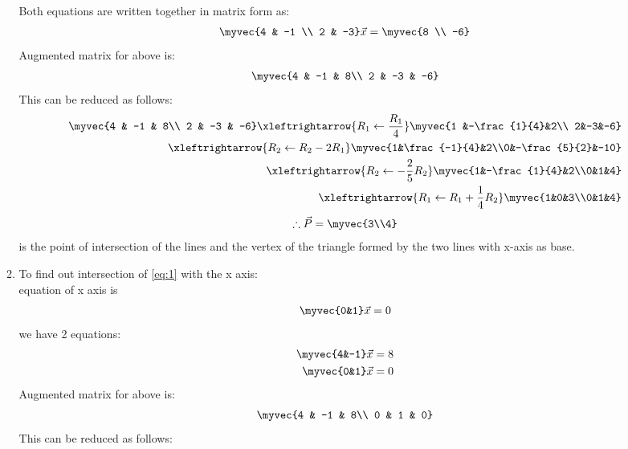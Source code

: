 \documentclass[journal,12pt,twocolumn]{IEEEtran}
\renewcommand\thesection{\arabic{section}}
\begin{document}
\begin{enumerate}[label=\thesection.\arabic*.,ref=\thesection.\theenumi]
\begin{enumerate}
Both equations are written together in matrix form as:
\begin{align}
    \myvec{4 & -1 \\ 2 & -3}\vec{x}=
\myvec{8 \\ -6}
\end{align}
Augmented matrix for above is:
\begin{align}
    \myvec{4 & -1 & 8\\
           2 & -3 & -6}
\end{align}
This can be reduced as follows:
 \begin{align}
     \myvec{4 & -1 & 8\\
           2 & -3 & -6}
          \xleftrightarrow{R_1 \leftarrow \frac{R_1}{4}}
    \myvec{1 &-\frac{1}{4}&2\\
        2&-3&-6}\\
        \xleftrightarrow{R_2\leftarrow R_2-2R_1}
    \myvec{1&\frac{-1}{4}&2\\0&-\frac{5}{2}&-10}\\
    \xleftrightarrow{R_2\leftarrow -\frac{2}{5}R_2}
    \myvec{1&-\frac{1}{4}&2\\0&1&4}\\
    \xleftrightarrow{R_1\leftarrow R_1+\frac{1}{4}R_2}
    \myvec{1&0&3\\0&1&4}
 \end{align}
\begin{align}
\therefore \vec{P}=\myvec{3\\4}
\end{align}
is the point of intersection of the lines and the vertex of the triangle formed by the two lines with x-axis as base.
\item To find out intersection of \eqref{eq:1} with the x axis:\\
    equation of x axis is 
    \begin{align}
        \myvec{0&1}\vec{x}=0
    \end{align}
    we have 2 equations: \begin{align}
        \myvec{4&-1}\vec{x}=8\\
        \myvec{0&1}\vec{x}=0
    \end{align}
    Augmented matrix for above is:
\begin{align}
    \myvec{4 & -1 & 8\\
           0 & 1 & 0}
\end{align}
This can be reduced as follows:\\
\begin{align}

\end{align}
\end{enumerate}
\end{enumerate}
\end{document}
